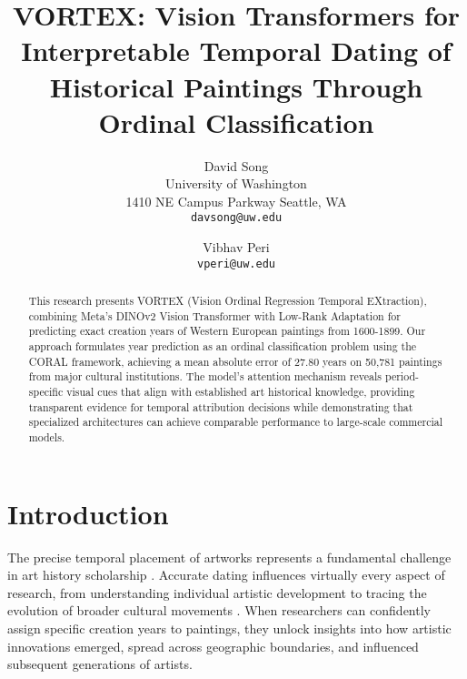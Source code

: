 \documentclass[10pt,twocolumn,letterpaper]{article}
\begin{document}
\title{VORTEX: Vision Transformers for Interpretable Temporal Dating of Historical Paintings Through Ordinal Classification}

\author{David Song\\
University of Washington\\
1410 NE Campus Parkway Seattle, WA\\
{\tt\small davsong@uw.edu}
\and
Vibhav Peri\\
{\tt\small vperi@uw.edu}
}
\maketitle

\begin{abstract}

This research presents VORTEX (Vision Ordinal Regression Temporal EXtraction), combining Meta's DINOv2 Vision Transformer with Low-Rank Adaptation for predicting exact creation years of Western European paintings from 1600-1899. Our approach formulates year prediction as an ordinal classification problem using the CORAL framework, achieving a mean absolute error of 27.80 years on 50,781 paintings from major cultural institutions. The model's attention mechanism reveals period-specific visual cues that align with established art historical knowledge, providing transparent evidence for temporal attribution decisions while demonstrating that specialized architectures can achieve comparable performance to large-scale commercial models.

\end{abstract}

\section{Introduction}

The precise temporal placement of artworks represents a fundamental challenge in art history scholarship \cite{Mishory00}. Accurate dating influences virtually every aspect of research, from understanding individual artistic development to tracing the evolution of broader cultural movements \cite{Elgammal18}. When researchers can confidently assign specific creation years to paintings, they unlock insights into how artistic innovations emerged, spread across geographic boundaries, and influenced subsequent generations of artists.
\end{document}
